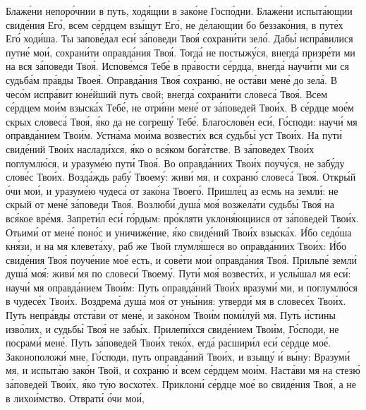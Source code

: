 Блаже́ни непоро́чнии в путь, ходя́щии в зако́не Госпо́дни. Блаже́ни
испыта́ющии свиде́ния Его́, всем се́рдцем взы́щут Его́, не де́лающии бо
беззако́ния, в путе́х Его́ ходи́ша. Ты запове́дал еси́ за́поведи Твоя́ сохрани́ти
зело́. Дабы́ испра́вилися путие́ мои́, сохрани́ти оправда́ния Твоя́. Тогда́ не
постыжу́ся, внегда́ призре́ти ми на вся за́поведи Твоя́. Испове́мся Тебе́ в
пра́вости се́рдца, внегда́ научи́ти ми ся судьба́м пра́вды Твоея́. Оправда́ния
Твоя́ сохраню́, не оста́ви мене́ до зела́. В чесо́м испра́вит юне́йший путь свой;
внегда́ сохрани́ти словеса́ Твоя́. Всем се́рдцем мои́м взыска́х Тебе́, не отри́ни
мене́ от за́поведей Твои́х. В се́рдце мое́м скрых словеса́ Твоя́, я́ко да не
согрешу́ Тебе́. Благослове́н еси́, Го́споди: научи́ мя оправда́нием Твои́м.
Устна́ма мои́ма возвести́х вся судьбы́ уст Твои́х. На пути́ свиде́ний Твои́х
наслади́хся, я́ко о вся́ком бога́тстве. В за́поведех Твои́х поглумлю́ся, и
уразуме́ю пути́ Твоя́. Во оправда́ниих Твои́х поучу́ся, не забу́ду слове́с
Твои́х. Возда́ждь рабу́ Твоему́: живи́ мя, и сохраню́ словеса́ Твоя́.
Откры́й о́чи мои́, и уразуме́ю чудеса́ от зако́на Твоего́. Пришле́ц
аз есмь на земли́: не скрый от мене́ за́поведи Твоя́. Возлюби́ душа́
моя́ возжела́ти судьбы́ Твоя́ на вся́кое вре́мя. Запрети́л еси́ го́рдым:
про́кляти уклоня́ющиися от за́поведей Твои́х. Отьими́ от мене́ поно́с и
уничиже́ние, я́ко свиде́ний Твои́х взыска́х. И́бо седо́ша кня́зи, и на мя
клевета́ху, раб же Твой глумля́шеся во оправда́ниих Твои́х: И́бо свиде́ния
Твоя́ поуче́ние мое́ есть, и сове́ти мои́ оправда́ния Твоя́. Прильпе́
земли́ душа́ моя́: живи́ мя по словеси́ Твоему́. Пути́ моя́ возвести́х, и
услы́шал мя еси́: научи́ мя оправда́нием Твои́м: Путь оправда́ний Твои́х
вразуми́ ми, и поглумлю́ся в чудесе́х Твои́х. Воздрема́ душа́ моя́ от
уны́ния: утверди́ мя в словесе́х Твои́х. Путь непра́вды отста́ви от
мене́, и зако́ном Твои́м поми́луй мя. Путь и́стины изво́лих, и судьбы́
Твоя́ не забы́х. Прилепи́хся свиде́нием Твои́м, Го́споди, не посрами́
мене́. Путь за́поведей Твои́х теко́х, егда́ расшири́л еси́ се́рдце мое́.
Законоположи́ мне, Го́споди, путь оправда́ний Твои́х, и взыщу́ и́ вы́ну:
Вразуми́ мя, и испыта́ю зако́н Твой, и сохраню́ и́ всем се́рдцем мои́м.
Наста́ви мя на стезю́ за́поведей Твои́х, я́ко ту́ю восхоте́х. Приклони́
се́рдце мое́ во свиде́ния Твоя́, а не в лихои́мство. Отврати́ о́чи мои́,

